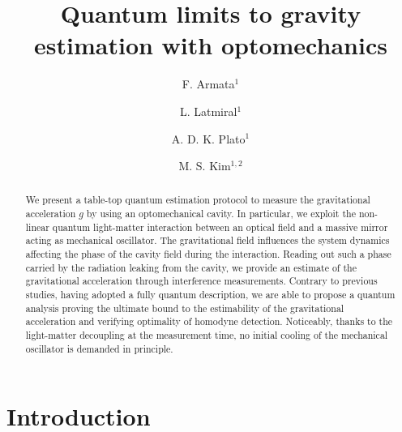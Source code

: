 \documentclass[aps,twocolumn,preprintnumbers,amsmath,amssymb]{revtex4}
\begin{document}
\title{Quantum limits to gravity estimation with optomechanics}

\author{F. Armata$^1$}

\author{ L. Latmiral$^{1}$}

\author{A. D. K. Plato$^1$}

\author{M. S.  Kim$^{1,2}$}


\begin{abstract}
We present a table-top quantum estimation protocol to measure the gravitational acceleration $g$ by using an optomechanical cavity. In particular, we exploit the non-linear quantum light-matter interaction between an optical field and a massive mirror acting as mechanical oscillator. The gravitational field influences the system dynamics affecting the phase of the cavity field during the interaction. Reading out such a phase carried by the radiation leaking from the cavity, we provide an estimate of the gravitational acceleration through interference measurements. Contrary to previous studies, having adopted a fully quantum description, we are able to propose a quantum analysis proving the ultimate bound to the estimability of the gravitational acceleration and verifying optimality of homodyne detection. Noticeably, thanks to the light-matter decoupling at the measurement time, no initial cooling of the mechanical oscillator is demanded in principle.
\end{abstract}

\flushbottom
\maketitle
\noindent
\section{Introduction}
\end{document}
